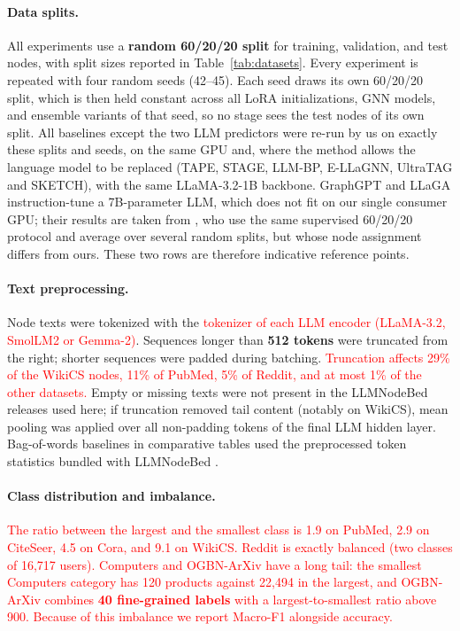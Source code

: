 \documentclass[a4paper,fleqn]{cas-sc}
\newcommand{\revone}[1]{\textcolor{red}{#1}}   %
\DeclareRobustCommand{\revcommon}[2][]{\textcolor{revshared}{#2}} %
\begin{document}
\paragraph{Data splits.}
All experiments use a \textbf{random 60/20/20 split} for training, validation, and test nodes, with split sizes reported in Table~\ref{tab:datasets}. \revcommon[R1,R4]{Every experiment is repeated with four random seeds (42--45). Each seed draws its own 60/20/20 split, which is then held constant across all LoRA initializations, GNN models, and ensemble variants of that seed, so no stage sees the test nodes of its own split.} \revcommon[R1,R4]{All baselines except the two LLM predictors were re-run by us on exactly these splits and seeds, on the same GPU and, where the method allows the language model to be replaced (TAPE, STAGE, LLM-BP, E-LLaGNN, UltraTAG and SKETCH), with the same LLaMA-3.2-1B backbone. GraphGPT and LLaGA instruction-tune a 7B-parameter LLM, which does not fit on our single consumer GPU; their results are taken from \citet{Wu2025LLMNode}, who use the same supervised 60/20/20 protocol and average over several random splits, but whose node assignment differs from ours. These two rows are therefore indicative reference points.}
\paragraph{Text preprocessing.}
Node texts were tokenized with the \revone{tokenizer of each LLM encoder (LLaMA-3.2, SmolLM2 or Gemma-2)}. Sequences longer than \textbf{512 tokens} were truncated from the right; shorter sequences were padded during batching. \revone{Truncation affects 29\% of the WikiCS nodes, 11\% of PubMed, 5\% of Reddit, and at most 1\% of the other datasets.} Empty or missing texts were not present in the LLMNodeBed releases used here; if truncation removed tail content (notably on WikiCS), mean pooling was applied over all non-padding tokens of the final LLM hidden layer. Bag-of-words baselines in comparative tables used the preprocessed token statistics bundled with LLMNodeBed \citep{Wu2025LLMNode}.
\paragraph{Class distribution and imbalance.}
\revone{The ratio between the largest and the smallest class is 1.9 on PubMed, 2.9 on CiteSeer, 4.5 on Cora, and 9.1 on WikiCS. Reddit is exactly balanced (two classes of 16,717 users). Computers and OGBN-ArXiv have a long tail: the smallest Computers category has 120 products against 22,494 in the largest, and OGBN-ArXiv combines \textbf{40 fine-grained labels} with a largest-to-smallest ratio above 900. Because of this imbalance we report Macro-F1 alongside accuracy.}
\end{document}
